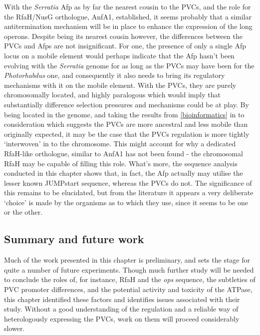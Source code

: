 With the \emph{Serratia} Afp as by far the nearest cousin to the PVCs, and the role for the RfaH/NusG orthologue, AnfA1, established, it seems probably that a similar antitermination mechanism will be in place to enhance the expression of the long operons. Despite being its nearest cousin however, the differences between the PVCs and Afps are not insignificant. For one, the presence of only a single Afp locus on a mobile element would perhaps indicate that the Afp hasn't been evolving with the \emph{Serratia} genome for as long as the PVCs may have been for the \emph{Photorhabdus} one, and consequently it also needs to bring its regulatory mechanisms with it on the mobile element. With the PVCs, they are purely chromosomally located, and highly paralogous which would imply that substantially difference selection pressures and mechanisms could be at play. By being located in the genome, and taking the results from \vref{bioinformatics} in to consideration which suggests the PVCs are more ancestral and less mobile than originally expected, it may be the case that the PVCs regulation is more tightly `interwoven' in to the chromosome. This might account for why a dedicated RfaH-like orthologue, similar to AnfA1 has not been found - the chromosomal RfaH may be capable of filling this role. What's more, the sequence analysis conducted in this chapter shows that, in fact, the Afp actually may utilise the lesser known JUMPstart sequence, whereas the PVCs do not. The significance of this remains to be elucidated, but from the literature it appears a very deliberate `choice' is made by the organisms as to which they use, since it seems to be one or the other.



\subsection{Summary and future work}

Much of the work presented in this chapter is preliminary, and sets the stage for quite a number of future experiments. Though much further study will be needed to conclude the roles of, for instance, RfaH and the \emph{ops} sequence, the subtleties of PVC promoter differences, and the potential activity and toxicity of the ATPase, this chapter identified these factors and identifies issues associated with their study. Without a good understanding of the regulation and a reliable way of heterologously expressing the PVCs, work on them will proceed considerably slower.

